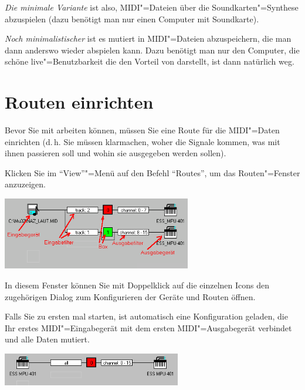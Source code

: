 \emph{Die minimale Variante} ist also, MIDI"=Dateien über die 
Soundkarten"=Synthese abzuspielen (dazu benötigt man nur einen 
Computer mit Soundkarte).


\emph{Noch minimalistischer} ist es
 mutiert in MIDI"=Dateien
abzuspeichern, die man dann anderswo wieder abspielen kann. Dazu
benötigt man nur den Computer, die schöne live"=Benutzbarkeit die den
Vorteil von \mutabor{} darstellt, ist dann natürlich weg.

\section{Routen einrichten}\label{sec:CC_ROUTES}

Bevor Sie mit \mutabor{} arbeiten können, müssen Sie eine Route für
die MIDI"=Daten einrichten (d.\,h. Sie müssen \mutabor{} klarmachen,
woher die Signale kommen, was mit ihnen passieren soll und wohin sie
ausgegeben werden sollen).


Klicken Sie im "`View"'"=Menü auf den Befehl "`Routes"', 
um das Routen"=Fenster anzuzeigen.


\begin{center}
\ifhtml
{}
\else
\includegraphics[width=234pt]{Route}
\fi
\end{center}

In diesem Fenster können Sie mit Doppelklick auf die einzelnen Icons
den zugehörigen Dialog zum Konfigurieren der Geräte und Routen öffnen.

Falls Sie \mutabor{} zu ersten mal starten, ist automatisch 
eine Konfiguration geladen, die Ihr erstes MIDI"=Eingabegerät 
mit dem ersten MIDI"=Ausgabegerät verbindet und alle Daten mutiert.

\begin{center}
\ifhtml
{}
\else
\includegraphics[width=221.5pt]{cc_route}
\fi
\end{center}

